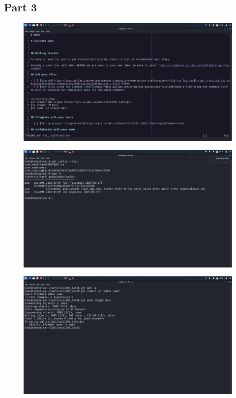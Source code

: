 \documentclass{article}
\numberwithin{equation}{subsection}
\begin{document}
	\subsection{Part 3}
	\begin{figure}[H]
		\includegraphics[width=430pt]{pics/Screenshot_2025-03-07_12_20_15.png}
	\end{figure}
	\begin{figure}[H]
		\includegraphics[width=430pt]{pics/Screenshot_2025-03-07_12_22_40.png}
	\end{figure}
	\begin{figure}[H]
		\includegraphics[width=430pt]{pics/Screenshot_2025-03-07_12_23_50.png}
	\end{figure}
\end{document}
